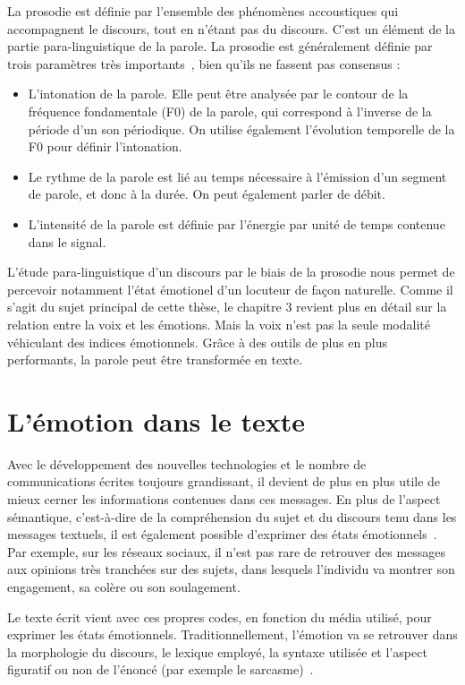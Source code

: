 La prosodie est définie par l'ensemble des phénomènes accoustiques qui accompagnent le discours, tout en n'étant pas du discours. C'est un élément de la partie para-linguistique de la parole. La prosodie est généralement définie par trois paramètres très importants~\cite{Srinivasan2003,Dohen2004}, bien qu'ils ne fassent pas consensus :
\begin{itemize}
  \item L'intonation de la parole. Elle peut être analysée par le contour de la fréquence fondamentale (F0) de la parole, qui correspond à l'inverse de la période d'un son périodique. On utilise également l'évolution temporelle de la F0 pour définir l'intonation.
  \item Le rythme de la parole est lié au temps nécessaire à l'émission d'un segment de parole, et donc à la durée. On peut également parler de débit.
  \item L'intensité de la parole est définie par l'énergie  par unité de temps contenue dans le signal.
\end{itemize}
L'étude para-linguistique d'un discours par le biais de la prosodie nous permet de percevoir notamment l'état émotionel d'un locuteur de façon naturelle. Comme il s'agit du sujet principal de cette thèse, le chapitre 3 revient plus en détail sur la relation entre la voix et les émotions. Mais la voix n'est pas la seule modalité véhiculant des indices émotionnels. Grâce à des outils de plus en plus performants, la parole peut être transformée en texte.

\section{L'émotion dans le texte}
Avec le développement des nouvelles technologies et le nombre de communications écrites toujours grandissant, il devient de plus en plus utile de mieux cerner les informations contenues dans ces messages. En plus de l'aspect sémantique, c'est-à-dire de la compréhension du sujet et du discours tenu dans les messages textuels, il est également possible d'exprimer des états émotionnels~\cite{Hancock2007,SchwarzFriesel2015}. Par exemple, sur les réseaux sociaux, il n'est pas rare de retrouver des messages aux opinions très tranchées sur des sujets, dans lesquels l'individu va montrer son engagement, sa colère ou son soulagement.

Le texte écrit vient avec ces propres codes, en fonction du média utilisé, pour exprimer les états émotionnels. Traditionnellement, l'émotion va se retrouver dans la morphologie du discours, le lexique employé, la syntaxe utilisée et l'aspect figuratif ou non de l'énoncé (par exemple le sarcasme)~\cite{Sailunaz2018}.


